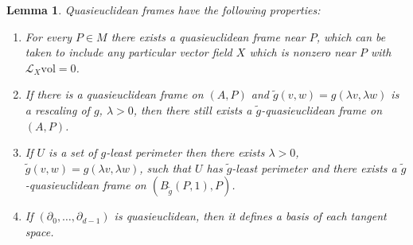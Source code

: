 \documentclass[reqno,12pt,letterpaper]{amsart}
\newcommand{\vol}{\mathrm{vol}}
\newtheorem{lemma}[theorem]{Lemma}
\theoremstyle{definition}
\numberwithin{equation}{section}
\begin{document}
\begin{lemma}\label{extend to quasieuclid}
Quasieuclidean frames have the following properties:
\begin{enumerate}
\item For every $P \in M$ there exists a quasieuclidean frame near $P$, which can be taken to include any particular vector field $X$ which is nonzero near $P$ with $\mathcal L_X\vol = 0$.
\item If there is a quasieuclidean frame on $(A, P)$ and $\tilde g(v, w) = g(\lambda v, \lambda w)$ is a rescaling of $g$, $\lambda > 0$, then there still exists a $\tilde g$-quasieuclidean frame on $(A, P)$.
\item If $U$ is a set of $g$-least perimeter then there exists $\lambda > 0$, $\tilde g(v, w) = g(\lambda v, \lambda w)$, such that $U$ has $\tilde g$-least perimeter and there exists a $\tilde g$-quasieuclidean frame on $(B_{\tilde g}(P, 1), P)$.
\item If $(\partial_0, \dots, \partial_{d - 1})$ is quasieuclidean, then it defines a basis of each tangent space.
\end{enumerate}
\end{lemma}
\end{document}

